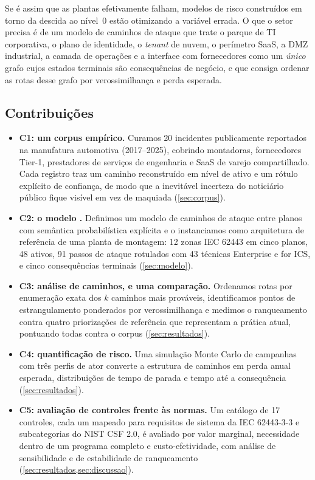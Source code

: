 Se é assim que as plantas efetivamente falham, modelos de risco construídos em
torno da descida ao nível~0 estão otimizando a variável errada. O que o setor
precisa é de um modelo de caminhos de ataque que trate o parque de TI
corporativa, o plano de identidade, o \emph{tenant} de nuvem, o perímetro SaaS,
a DMZ industrial, a camada de operações e a interface com fornecedores como um
\emph{único} grafo cujos estados terminais são consequências de negócio, e que
consiga ordenar as rotas desse grafo por verossimilhança e perda esperada.

\subsection{Contribuições}

\begin{itemize}
  \item \textbf{C1: um corpus empírico.} Curamos 20 incidentes publicamente
    reportados na manufatura automotiva (2017--2025), cobrindo montadoras,
    fornecedores Tier-1, prestadores de serviços de engenharia e SaaS de varejo
    compartilhado. Cada registro traz um caminho reconstruído em nível de ativo
    e um rótulo explícito de confiança, de modo que a inevitável incerteza do
    noticiário público fique visível em vez de maquiada (\cref{sec:corpus}).
  \item \textbf{C2: o modelo \capm{}.} Definimos um modelo de caminhos de
    ataque entre planos com semântica probabilística explícita e o instanciamos
    como arquitetura de referência de uma planta de montagem: 12 zonas IEC
    62443 em cinco planos, 48 ativos, 91 passos de ataque rotulados com 43
    técnicas \attck{} Enterprise e \attck{} for ICS, e cinco consequências
    terminais (\cref{sec:modelo}).
  \item \textbf{C3: análise de caminhos, e uma comparação.} Ordenamos rotas
    por enumeração exata dos $k$ caminhos mais prováveis, identificamos pontos de
    estrangulamento ponderados por verossimilhança e medimos o ranqueamento
    contra quatro priorizações de referência que representam a prática atual,
    pontuando todas contra o corpus (\cref{sec:resultados}).
  \item \textbf{C4: quantificação de risco.} Uma simulação Monte Carlo de
    campanhas com três perfis de ator converte a estrutura de caminhos em perda
    anual esperada, distribuições de tempo de parada e tempo até a consequência
    (\cref{sec:resultados}).
  \item \textbf{C5: avaliação de controles frente às normas.} Um catálogo de
    17 controles, cada um mapeado para requisitos de sistema da IEC 62443-3-3 e
    subcategorias do NIST CSF 2.0, é avaliado por valor marginal, necessidade
    dentro de um programa completo e custo-efetividade, com análise de
    sensibilidade e de estabilidade de ranqueamento
    (\cref{sec:resultados,sec:discussao}).
\end{itemize}

